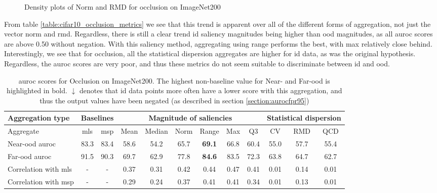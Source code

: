 \documentclass[UKenglish]{uiomasterthesis} %
\theoremstyle{definition}
\begin{document}
\begin{figure}[H]
    \begin{center}
        
    \end{center}
    \caption[Density plots of Norm and RMD for occlusion on ImageNet200]{Density plots of Norm and RMD for occlusion on ImageNet200}
    \label{fig:imagenet200_occlusion_mean_rmd}
\end{figure}

From table \ref{table:cifar10_occlusion_metrics} we see that this trend is apparent over all of the different forms of aggregation, not just the vector norm and \ac{rmd}. Regardless, there is still a clear trend \ac{id} saliency magnitudes being higher than \ac{ood} magnitudes, as all \ac{auroc} scores are above 0.50 without negation. With this saliency method, aggregating using range performs the best, with max relatively close behind. Interestingly, we see that for occlusion, all the statistical dispersion aggregates are higher for \ac{id} data, as was the original hypothesis. Regardless, the \ac{auroc} scores are very poor, and thus these metrics do not seem suitable to discriminate between \ac{id} and \ac{ood}.

\begin{table}[H]
\setlength\tabcolsep{3pt}
\begin{center}
\begin{tabular}{ |p{5.1em}|c c|c c c c c c|c c c| }
    \hline
     \centering Aggregation type & \multicolumn{2}{c|}{Baselines} & \multicolumn{6}{c|}{Magnitude of saliencies} & \multicolumn{3}{p{8em}|}{\centering Statistical dispersion} \\
    \hline
    Aggregate & \ac{mls} & \ac{msp} & Mean & Median & Norm & Range & Max & Q3 & CV & RMD & QCD  \\
    \hline
    \rowcolor{near!50}
    Near-\ac{ood} \ac{auroc} & 83.3 & 83.4 & 58.6 & 54.2 & 65.7 &\textbf{ 69.1 }& 66.8 & 60.4 & 55.0 & 57.7 & 55.4  \\
    \hline
    \rowcolor{far!50}
    Far-\ac{ood} \ac{auroc} & 91.5 & 90.3 & 69.7 & 62.9 & 77.8 &\textbf{ 84.6 }& 83.5 & 72.3 & 63.8 & 64.7 & 62.7  \\
    \hline
    Correlation with \ac{mls}& - & - & 0.37 & 0.31 & 0.42 & 0.44 & 0.47 & 0.41 & 0.01 & 0.14 & 0.01  \\
    \hline
    Correlation with \ac{msp}& - & - & 0.29 & 0.24 & 0.37 & 0.41 & 0.41 & 0.34 & 0.01 & 0.13 & 0.01  \\
    \hline
    \end{tabular}
    \caption[\ac{auroc} scores for Occlusion on ImageNet200]{\ac{auroc} scores for Occlusion on ImageNet200. The highest non-baseline value for Near- and Far-\ac{ood} is highlighted in bold. $\downarrow$ denotes that \ac{id} data points more often have a lower score with this aggregation, and thus the output values have been negated (as described in section \ref{section:aurocfpr95})}
    \label{table:imagenet200_occlusion_metrics}
\end{center}
\setlength\tabcolsep{6pt}
\end{table}
\end{document}
